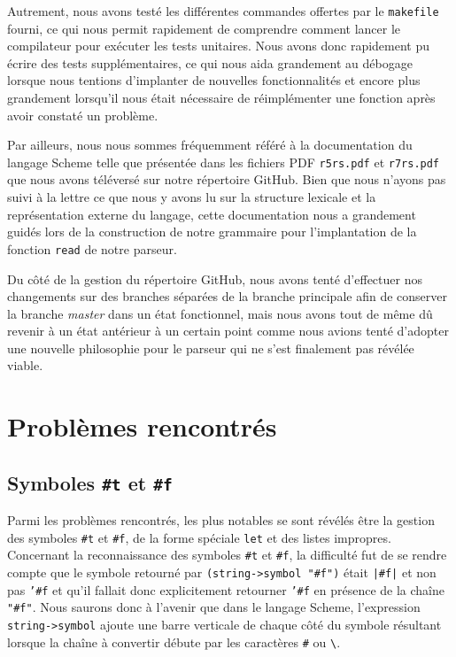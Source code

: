 \documentclass[12pt]{article}
\begin{document}
Autrement, nous avons testé les différentes commandes offertes par le \texttt{makefile} fourni, ce qui nous permit rapidement de comprendre comment lancer le compilateur pour exécuter les tests unitaires. Nous avons donc rapidement pu écrire des tests supplémentaires, ce qui nous aida grandement au débogage lorsque nous tentions d'implanter de nouvelles fonctionnalités et encore plus grandement lorsqu'il nous était nécessaire de réimplémenter une fonction après avoir constaté un problème.

Par ailleurs, nous nous sommes fréquemment référé à la documentation du langage Scheme telle que présentée dans les fichiers PDF \texttt{r5rs.pdf} et \texttt{r7rs.pdf} que nous avons téléversé sur notre répertoire GitHub. Bien que nous n'ayons pas suivi à la lettre ce que nous y avons lu sur la structure lexicale et la représentation externe du langage, cette documentation nous a grandement guidés lors de la construction de notre grammaire pour l'implantation de la fonction \texttt{read} de notre parseur.

Du côté de la gestion du répertoire GitHub, nous avons tenté d'effectuer nos changements sur des branches séparées de la branche principale afin de conserver la branche \textit{master} dans un état fonctionnel, mais nous avons tout de même dû revenir à un état antérieur à un certain point comme nous avions tenté d'adopter une nouvelle philosophie pour le parseur qui ne s'est finalement pas révélée viable.

\section{Problèmes rencontrés}

\subsection{Symboles \texttt{\#t} et \texttt{\#f}}
Parmi les problèmes rencontrés, les plus notables se sont révélés être la gestion des symboles \texttt{\#t} et \texttt{\#f}, de la forme spéciale \texttt{let} et des listes impropres. Concernant la reconnaissance des symboles \texttt{\#t} et \texttt{\#f}, la difficulté fut de se rendre compte que le symbole retourné par \texttt{(string->symbol "\#f")} était \texttt{|\#f|} et non pas \texttt{'\#f} et qu'il fallait donc explicitement retourner \texttt{'\#f} en présence de la chaîne \texttt{"\#f"}. Nous saurons donc à l'avenir que dans le langage Scheme, l'expression \texttt{string->symbol} ajoute une barre verticale de chaque côté du symbole résultant lorsque la chaîne à convertir débute par les caractères \texttt{\#} ou \texttt{\textbackslash}.
\end{document}
